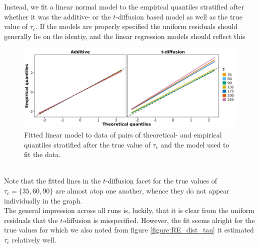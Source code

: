 Instead, we fit a linear normal model to the empirical quantiles stratified after whether it was the additive- or the $t$-diffusion based model as well as the true value of $\tau_c$. If the models are properly specified the uniform residuals should generally lie on the identiy, and the linear regression models should reflect this
\begin{figure}[h!]
    \begin{center}
        \includegraphics[scale = .075]{figures/quantiles_plot_tau.jpeg}
        \caption{Fitted linear model to data of pairs of theoretical- and empirical quantiles stratified after the true value of $\tau_c$ and the model used to fit the data.}
        \label{figure:QQ_plot_tau}
    \end{center}
\end{figure}\\
Note that the fitted lines in the $t$-diffusion facet for the true values of $\tau_c = \{35, 60, 90\}$ are almost atop one another, whence they do not appear individually in the graph. \\
The general impression across all runs is, luckily, that it is clear from the uniform residuals that the $t$-diffusion is misspecified. However, the fit seems alright for the true values for which we also noted from figure \ref{figure:RE_dist_tau} it estimated $\tau_c$ relatively well. 